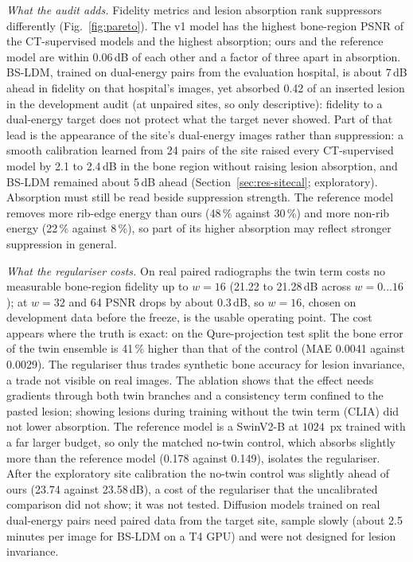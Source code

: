 \emph{What the audit adds.} Fidelity metrics and lesion absorption rank suppressors differently (Fig.~\ref{fig:pareto}). The v1 model has
the highest bone-region PSNR of the CT-supervised models and the highest absorption; ours and the reference model are within 0.06\,dB of
each other and a factor of three apart in absorption. BS-LDM, trained on dual-energy pairs from the evaluation hospital, is about 7\,dB ahead
in fidelity on that hospital's images, yet absorbed 0.42 of an inserted lesion in the development audit (at unpaired sites, so only
descriptive): fidelity to a dual-energy target does not protect what the target never showed. Part of that lead is the appearance of the
site's dual-energy images rather than suppression: a smooth calibration learned from 24 pairs of the site raised every CT-supervised model
by 2.1 to 2.4\,dB in the bone region without raising lesion absorption, and BS-LDM remained about 5\,dB ahead
(Section~\ref{sec:res-sitecal}; exploratory). Absorption must still be read beside
suppression strength. The reference model removes more rib-edge energy than ours (48\,\% against 30\,\%) and more non-rib energy (22\,\%
against 8\,\%), so part of its higher absorption may reflect stronger suppression in general.

\emph{What the regulariser costs.} On real paired radiographs the twin term costs no measurable bone-region fidelity up to $w=16$ (21.22 to
21.28\,dB across $w=0\ldots16$); at $w=32$ and 64 PSNR drops by about 0.3\,dB, so $w=16$, chosen on development data before the freeze, is
the usable operating point. The cost appears where the truth is exact: on the Qure-projection test split the bone error of the twin ensemble
is 41\,\% higher than that of the control (MAE 0.0041 against 0.0029). The regulariser thus trades synthetic bone accuracy for lesion
invariance, a trade not visible on real images. The ablation shows that the effect needs gradients through both twin branches and a
consistency term confined to the pasted lesion; showing lesions during training without the twin term (CLIA) did not lower absorption. The
reference model is a SwinV2-B at $1024$~px trained with a far larger budget, so only the matched no-twin control, which absorbs slightly more
than the reference model (0.178 against 0.149), isolates the regulariser. After the exploratory site calibration the no-twin control was
slightly ahead of ours (23.74 against 23.58\,dB), a cost of the regulariser that the uncalibrated comparison did not show; it was not
tested. Diffusion models trained on real dual-energy pairs
\cite{sun2026bsldm,sun2026debonedit} need paired data from the target site, sample slowly (about 2.5 minutes per image for BS-LDM on a T4
GPU) and were not designed for lesion invariance.


